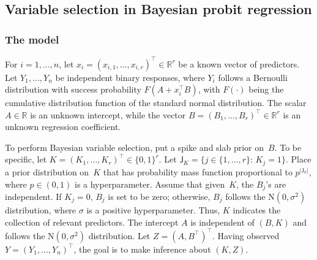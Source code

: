\documentclass[12pt]{article}
\begin{document}
\subsection{Variable selection in Bayesian probit regression}

\subsubsection{The model}


For $i = 1,\dots,n$, let $x_i = (x_{i,1}, \dots, x_{i,r})^{\top} \in \mathbb{R}^r$ be a known vector of predictors.
Let $Y_1, \dots, Y_n$ be independent binary responses, where  $Y_i$ follows a Bernoulli distribution with success probability $F(A+x_i^{\top} B)$, with $F(\cdot)$ being the cumulative distribution function of the standard normal distribution.
The scalar $A \in \mathbb{R}$ is an unknown intercept, while the vector $B= (B_1, \dots, B_r)^{\top} \in \mathbb{R}^r$ is an unknown regression coefficient.


To perform Bayesian variable selection, put a spike and slab prior on~$B$.
To be specific, let $K = (K_1, \dots, K_r)^{\top} \in \{0,1\}^r$.
Let $\mathsf{J}_K = \{j \in \{1,\dots,r\}: \, K_j = 1\}$.
Place a prior distribution on~$K$ that has probability mass function proportional to $p^{|\mathsf{J}_k|}$, where $p \in (0,1)$ is a hyperparameter.
Assume that given~$K$, the $B_j$'s are independent.
If $K_j = 0$, $B_j$ is set to be zero; otherwise, $B_j$ follows the  $\mbox{N}(0,\sigma^2)$ distribution, where $\sigma$ is a positive hyperparameter.
Thus, $K$ indicates the collection of relevant predictors.
The intercept $A$ is independent of $(B,K)$ and follows the $\mbox{N}(0,\sigma^2)$ distribution.
Let $Z = (A, B^{\top})^{\top}$.
Having observed $Y = (Y_1, \dots, Y_n)^{\top}$, the goal is to make inference about $(K, Z)$.
\end{document}
